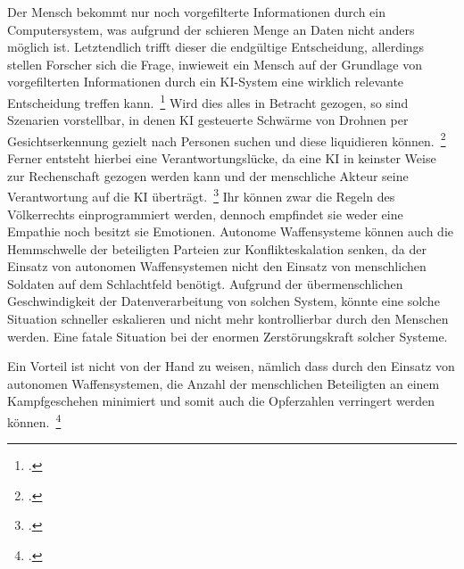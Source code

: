 Der Mensch bekommt nur noch vorgefilterte Informationen durch ein Computersystem, was aufgrund der schieren Menge an Daten nicht anders möglich ist. Letztendlich trifft dieser
die endgültige Entscheidung, allerdings stellen Forscher sich die Frage, inwieweit ein Mensch auf der Grundlage von vorgefilterten Informationen durch ein \ac{KI}-System eine wirklich relevante Entscheidung treffen kann.~\footcite[\vglf][]{Lenzen.2020}
Wird dies alles in Betracht gezogen, so sind Szenarien vorstellbar, in denen \ac{KI} gesteuerte Schwärme von Drohnen per Gesichtserkennung gezielt nach Personen suchen und diese liquidieren können.~\footcite[\vglf][]{Kipper.2020}
Ferner entsteht hierbei eine Verantwortungslücke, da eine \ac{KI} in keinster Weise zur Rechenschaft gezogen werden kann und der menschliche Akteur seine Verantwortung auf die 
\ac{KI} überträgt.~\footcite[\vglf][]{Heinrichs.2022}
Ihr können zwar die Regeln des Völkerrechts einprogrammiert werden, dennoch empfindet sie weder eine Empathie noch besitzt sie Emotionen.
Autonome Waffensysteme können auch die Hemmschwelle der beteiligten Parteien zur Konflikteskalation senken, da der Einsatz von autonomen Waffensystemen nicht den Einsatz 
von menschlichen Soldaten auf dem Schlachtfeld benötigt.
Aufgrund der übermenschlichen Geschwindigkeit der Datenverarbeitung von solchen System, könnte eine solche Situation schneller eskalieren und nicht mehr kontrollierbar durch den Menschen werden.
Eine fatale Situation bei der enormen Zerstörungskraft solcher Systeme.

Ein Vorteil ist nicht von der Hand zu weisen, nämlich dass durch den Einsatz von autonomen Waffensystemen, die Anzahl der menschlichen Beteiligten an einem Kampfgeschehen minimiert und 
somit auch die Opferzahlen verringert werden können.~\footcite[\vglf][]{Kipper.2020}